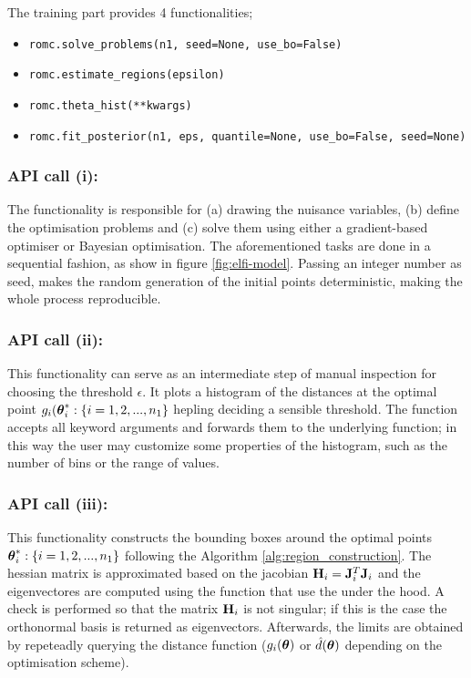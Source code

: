The training part provides 4 functionalities;

\begin{itemize}
\item \texttt{romc.solve_problems(n1, seed=None, use_bo=False)}
\item \texttt{romc.estimate_regions(epsilon)}
\item \texttt{romc.theta_hist(**kwargs)}
\item \texttt{romc.fit_posterior(n1, eps, quantile=None, use_bo=False, seed=None)}
\end{itemize}


\subsubsection*{API call (i): }

\noindent
The functionality is responsible for (a) drawing the nuisance
variables, (b) define the optimisation problems and (c) solve them
using either a gradient-based optimiser or Bayesian optimisation. The
aforementioned tasks are done in a sequential fashion, as show in
figure \ref{fig:elfi-model}. Passing an integer number as seed, makes
the random generation of the initial points deterministic, making the
whole process reproducible.

\subsubsection*{API call (ii): }

This functionality can serve as an intermediate step of manual
inspection for choosing the threshold $\epsilon$. It plots a histogram
of the distances at the optimal point
$g_i(\boldsymbol{\theta}_i^* : \{i = 1, 2, ..., n_1\}$ hepling deciding a sensible
threshold. The function accepts all keyword arguments and forwards
them to the underlying  function; in this
way the user may customize some properties of the histogram, such as
the number of bins or the range of values.


\subsubsection*{API call (iii): }

This functionality constructs the bounding boxes around the optimal
points $\boldsymbol{\theta}_i^* : \{ i = 1, 2, ..., n_1 \}$ following the
Algorithm \ref{alg:region_construction}. The hessian matrix is
approximated based on the jacobian $\mathbf{H}_i = \mathbf{J}_i^T \mathbf{J}_i$ and the
eigenvectores are computed using the function
 that use the  under
the hood. A check is performed so that the matrix $\mathbf{H}_i$ is not
singular; if this is the case the orthonormal basis is returned as
eigenvectors. Afterwards, the limits are obtained by repeteadly
querying the distance function ($g_i(\boldsymbol{\theta})$ or $\hat{d}(\boldsymbol{\theta})$
depending on the optimisation scheme).


